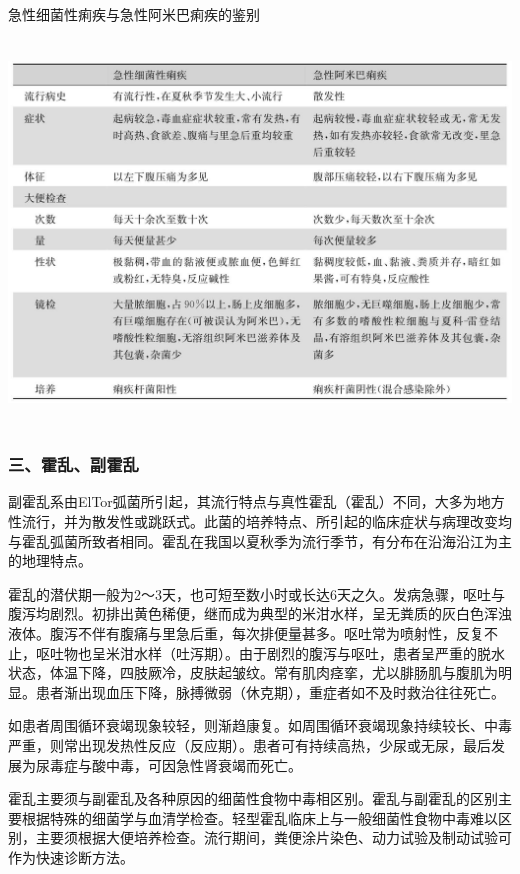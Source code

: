 \begin{table}[htbp]
\centering
\caption{急性细菌性痢疾与急性阿米巴痢疾的鉴别}
\label{tab23-5}
\includegraphics[width=5.9375in,height=4.03125in]{./images/Image00130.jpg}
\end{table}

\subsubsection{三、霍乱、副霍乱}

副霍乱系由ElTor弧菌所引起，其流行特点与真性霍乱（霍乱）不同，大多为地方性流行，并为散发性或跳跃式。此菌的培养特点、所引起的临床症状与病理改变均与霍乱弧菌所致者相同。霍乱在我国以夏秋季为流行季节，有分布在沿海沿江为主的地理特点。

霍乱的潜伏期一般为2～3天，也可短至数小时或长达6天之久。发病急骤，呕吐与腹泻均剧烈。初排出黄色稀便，继而成为典型的米泔水样，呈无粪质的灰白色浑浊液体。腹泻不伴有腹痛与里急后重，每次排便量甚多。呕吐常为喷射性，反复不止，呕吐物也呈米泔水样（吐泻期）。由于剧烈的腹泻与呕吐，患者呈严重的脱水状态，体温下降，四肢厥冷，皮肤起皱纹。常有肌肉痉挛，尤以腓肠肌与腹肌为明显。患者渐出现血压下降，脉搏微弱（休克期），重症者如不及时救治往往死亡。

如患者周围循环衰竭现象较轻，则渐趋康复。如周围循环衰竭现象持续较长、中毒严重，则常出现发热性反应（反应期）。患者可有持续高热，少尿或无尿，最后发展为尿毒症与酸中毒，可因急性肾衰竭而死亡。

霍乱主要须与副霍乱及各种原因的细菌性食物中毒相区别。霍乱与副霍乱的区别主要根据特殊的细菌学与血清学检查。轻型霍乱临床上与一般细菌性食物中毒难以区别，主要须根据大便培养检查。流行期间，粪便涂片染色、动力试验及制动试验可作为快速诊断方法。

